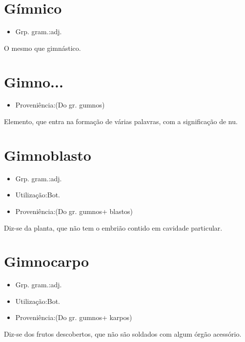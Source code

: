 \section{Gímnico}
\begin{itemize}
\item {Grp. gram.:adj.}
\end{itemize}
O mesmo que \textunderscore gimnástico\textunderscore .
\section{Gimno...}
\begin{itemize}
\item {Proveniência:(Do gr. \textunderscore gumnos\textunderscore )}
\end{itemize}
Elemento, que entra na formação de várias palavras, com a significação de \textunderscore nu\textunderscore .
\section{Gimnoblasto}
\begin{itemize}
\item {Grp. gram.:adj.}
\end{itemize}
\begin{itemize}
\item {Utilização:Bot.}
\end{itemize}
\begin{itemize}
\item {Proveniência:(Do gr. \textunderscore gumnos\textunderscore  + \textunderscore blastos\textunderscore )}
\end{itemize}
Diz-se da planta, que não tem o embrião contido em cavidade particular.
\section{Gimnocarpo}
\begin{itemize}
\item {Grp. gram.:adj.}
\end{itemize}
\begin{itemize}
\item {Utilização:Bot.}
\end{itemize}
\begin{itemize}
\item {Proveniência:(Do gr. \textunderscore gumnos\textunderscore  + \textunderscore karpos\textunderscore )}
\end{itemize}
Diz-se dos frutos descobertos, que não são soldados com algum órgão acessório.
